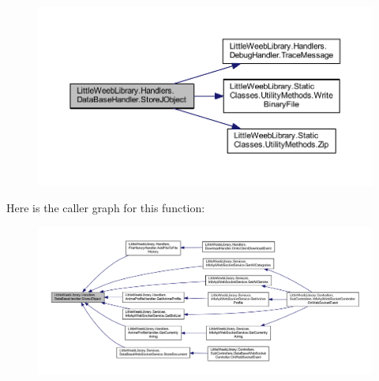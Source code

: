 \begin{figure}[H]
\begin{center}
\leavevmode
\includegraphics[width=350pt]{class_little_weeb_library_1_1_handlers_1_1_data_base_handler_a5e6a70ef81b049da46b6ae3a15b09cd3_cgraph}
\end{center}
\end{figure}
Here is the caller graph for this function\+:\nopagebreak
\begin{figure}[H]
\begin{center}
\leavevmode
\includegraphics[width=350pt]{class_little_weeb_library_1_1_handlers_1_1_data_base_handler_a5e6a70ef81b049da46b6ae3a15b09cd3_icgraph}
\end{center}
\end{figure}
\mbox{\label{class_little_weeb_library_1_1_handlers_1_1_data_base_handler_a9b2223ff71f688234f95d247ea3b5739}} 
